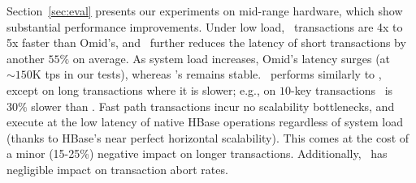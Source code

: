  
 Section~\ref{sec:eval} presents our experiments on mid-range hardware, which show substantial performance improvements.
Under low load, \sysll\ transactions are 4x to 5x faster than Omid's, 
and \sys\ further reduces the latency of short transactions by another $55\%$ on average.
As system load increases, Omid's latency surges (at  $\sim\!\!\!150$K tps in our tests),  
whereas \sys's remains stable. \syspc\ performs similarly to \sysll, except on long transactions
where it is slower; e.g., on $10$-key transactions \syspc\ is $30\%$ slower than \sysll.
Fast path transactions incur no scalability
bottlenecks, and execute at the low latency of native HBase operations regardless of system load
(thanks to HBase's near perfect horizontal scalability).
This comes at the cost of a minor (15-25\%) negative impact on longer transactions. 
Additionally, \sys\ has negligible impact on  transaction abort rates.


